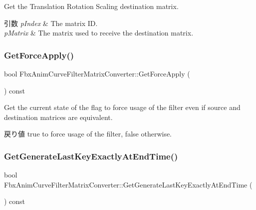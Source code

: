 Get the Translation Rotation Scaling destination matrix. 
\begin{DoxyParams}{引数}
{\em p\+Index} & The matrix ID. \\
\hline
{\em p\+Matrix} & The matrix used to receive the destination matrix. \\
\hline
\end{DoxyParams}
\mbox{\label{class_fbx_anim_curve_filter_matrix_converter_abeb4273e3155dd4644a35a68f39ebda3}} 
\subsubsection{\texorpdfstring{Get\+Force\+Apply()}{GetForceApply()}}
{\footnotesize\ttfamily bool Fbx\+Anim\+Curve\+Filter\+Matrix\+Converter\+::\+Get\+Force\+Apply (\begin{DoxyParamCaption}{ }\end{DoxyParamCaption}) const}

Get the current state of the flag to force usage of the filter even if source and destination matrices are equivalent. \begin{DoxyReturn}{戻り値}
{\ttfamily true} to force usage of the filter, {\ttfamily false} otherwise. 
\end{DoxyReturn}
\mbox{\label{class_fbx_anim_curve_filter_matrix_converter_a2721fda063f33bb95358c60df9a935f7}} 
\subsubsection{\texorpdfstring{Get\+Generate\+Last\+Key\+Exactly\+At\+End\+Time()}{GetGenerateLastKeyExactlyAtEndTime()}}
{\footnotesize\ttfamily bool Fbx\+Anim\+Curve\+Filter\+Matrix\+Converter\+::\+Get\+Generate\+Last\+Key\+Exactly\+At\+End\+Time (\begin{DoxyParamCaption}{ }\end{DoxyParamCaption}) const}

